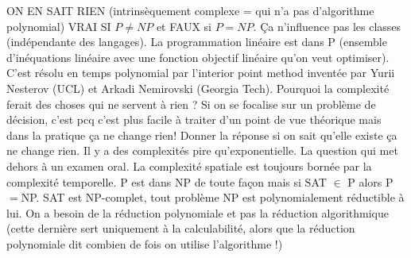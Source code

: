 \begin{mcqs}
  {ON EN SAIT RIEN (intrinsèquement complexe = qui n'a pas d'algorithme polynomial) VRAI SI $P \neq NP$ et FAUX si $P=NP$.}
  {Ça n'influence pas les classes (indépendante des langages).}
  {La programmation linéaire est dans P (ensemble d'inéquations linéaire avec une fonction objectif linéaire qu'on veut optimiser).
  C'est résolu en temps polynomial par l'interior point method inventée par Yurii Nesterov (UCL) et Arkadi Nemirovski (Georgia Tech).}
  {Pourquoi la complexité ferait des choses qui ne servent à rien ? Si on se focalise sur un problème de décision, c'est pcq c'est plus facile à traiter d'un point de vue théorique mais dans la pratique ça ne change rien! Donner la réponse si on sait qu'elle existe ça ne change rien.}
  {Il y a des complexités pire qu'exponentielle.}
  {La question qui met dehors à un examen oral.}
  {La complexité spatiale est toujours bornée par la complexité temporelle.}
  {P est dans NP de toute façon mais si SAT $\in$ P alors P${}={}$NP.}
  {SAT est NP-complet, tout problème NP est polynomialement réductible à lui.}
  {On a besoin de la réduction polynomiale et pas la réduction algorithmique (cette dernière sert uniquement à la calculabilité, alors que la réduction polynomiale dit combien de fois on utilise l'algorithme !)}
\end{mcqs}
